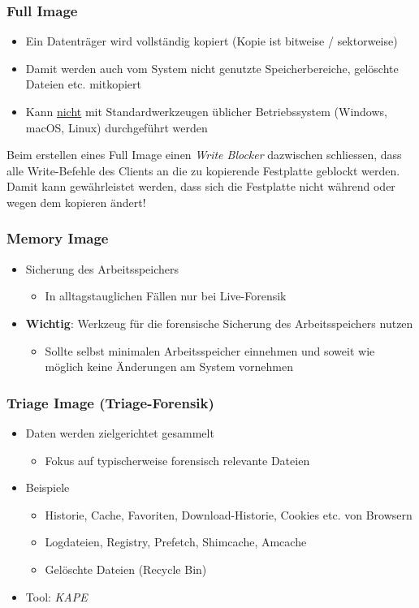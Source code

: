 \subsubsection{Full Image}
\begin{itemize}
    \item Ein Datenträger wird vollständig kopiert (Kopie ist bitweise / sektorweise)
    \item Damit werden auch vom System nicht genutzte Speicherbereiche, gelöschte Dateien etc. mitkopiert
    \item Kann \underline{nicht} mit Standardwerkzeugen üblicher Betriebssystem (Windows, macOS, Linux) durchgeführt werden
\end{itemize}

Beim erstellen eines Full Image einen \textit{Write Blocker} dazwischen schliessen, dass alle Write-Befehle des Clients an die zu kopierende Festplatte geblockt werden.
Damit kann gewährleistet werden, dass sich die Festplatte nicht während oder wegen dem kopieren ändert!

\subsubsection{Memory Image}
\begin{itemize}
    \item Sicherung des Arbeitsspeichers
    \begin{itemize}
        \item In alltagstauglichen Fällen nur bei Live-Forensik
    \end{itemize}
    \item \textbf{Wichtig}: Werkzeug für die forensische Sicherung des Arbeitsspeichers nutzen
    \begin{itemize}
        \item Sollte selbst minimalen Arbeitsspeicher einnehmen und soweit wie möglich keine Änderungen am System vornehmen
    \end{itemize}
\end{itemize}

\subsubsection{Triage Image (Triage-Forensik)}
\begin{itemize}
    \item Daten werden zielgerichtet gesammelt
    \begin{itemize}
        \item Fokus auf typischerweise forensisch relevante Dateien
    \end{itemize}
    \item Beispiele
    \begin{itemize}
        \item Historie, Cache, Favoriten, Download-Historie, Cookies etc. von Browsern
        \item Logdateien, Registry, Prefetch, Shimcache, Amcache
        \item Gelöschte Dateien (Recycle Bin)
    \end{itemize}
    \item Tool: \textit{KAPE}
\end{itemize}